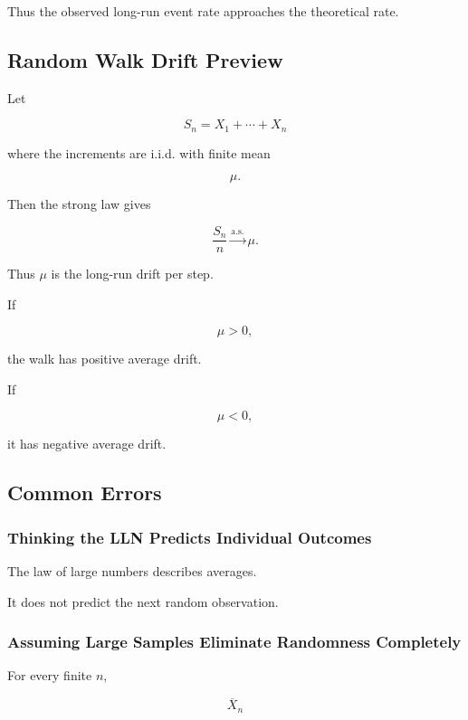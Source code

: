 Thus the observed long-run event rate approaches the theoretical rate.

\subsection{Random Walk Drift Preview}
\label{subsec:random-walk-drift-lln}

Let

\[
S_n
=
X_1+\cdots+X_n
\]

where the increments are i.i.d. with finite mean

\[
\mu.
\]

Then the strong law gives

\[
\boxed{
\frac{S_n}{n}
\xrightarrow{\text{a.s.}}
\mu.
}
\]

Thus \(\mu\) is the long-run drift per step.

If

\[
\mu>0,
\]

the walk has positive average drift.

If

\[
\mu<0,
\]

it has negative average drift.

\subsection{Common Errors}
\label{subsec:lln-common-errors}

\subsubsection{Thinking the LLN Predicts Individual Outcomes}

The law of large numbers describes averages.

It does not predict the next random observation.

\subsubsection{Assuming Large Samples Eliminate Randomness Completely}

For every finite \(n\),

\[
\overline{X}_n
\]

